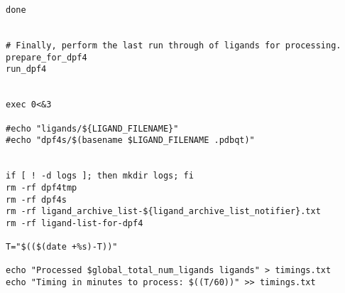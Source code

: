 \begin{changemargin}{-0.5in}{0in}
\begin{lstlisting}
done


# Finally, perform the last run through of ligands for processing.
prepare_for_dpf4
run_dpf4


exec 0<&3 

#echo "ligands/${LIGAND_FILENAME}"
#echo "dpf4s/$(basename $LIGAND_FILENAME .pdbqt)"


if [ ! -d logs ]; then mkdir logs; fi
rm -rf dpf4tmp
rm -rf dpf4s
rm -rf ligand_archive_list-${ligand_archive_list_notifier}.txt
rm -rf ligand-list-for-dpf4

T="$(($(date +%s)-T))"

echo "Processed $global_total_num_ligands ligands" > timings.txt
echo "Timing in minutes to process: $((T/60))" >> timings.txt


\end{lstlisting}

\end{changemargin}

\pagebreak
